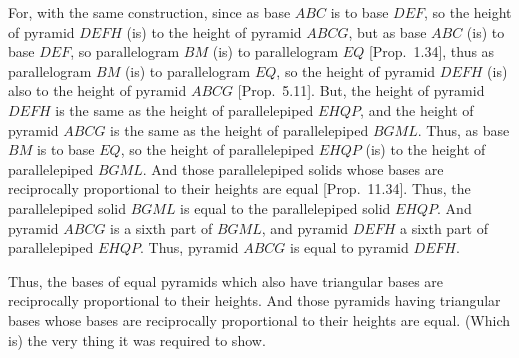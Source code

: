 \begin{Parallel}{}{}
{For, with the same construction, since as base $ABC$ is to base $DEF$, so the height of pyramid $DEFH$ (is)
to the height of pyramid $ABCG$, but as base $ABC$ (is) to base $DEF$, so parallelogram $BM$ (is)
to parallelogram $EQ$ [Prop.~1.34], thus as parallelogram $BM$ (is) to
parallelogram $EQ$, so the height of pyramid $DEFH$  (is) also to the height of pyramid $ABCG$ [Prop.~5.11]. But, 
the height of pyramid $DEFH$ is the same as the height of parallelepiped $EHQP$, and the height of
pyramid $ABCG$ is the same as the height of parallelepiped $BGML$. Thus, as base $BM$ is to
base $EQ$, so the height of parallelepiped $EHQP$ (is) to the height of parallelepiped $BGML$.
And those parallelepiped solids whose bases are reciprocally proportional to their
heights are equal [Prop.~11.34]. Thus, the parallelepiped solid $BGML$ is equal to the parallelepiped
solid $EHQP$. And pyramid $ABCG$ is a sixth part of $BGML$, and pyramid $DEFH$ a sixth part of
parallelepiped $EHQP$. Thus, pyramid $ABCG$ is equal to pyramid $DEFH$.

Thus,  the bases of equal pyramids which also have triangular bases are reciprocally
proportional to their heights. And those pyramids having triangular bases whose bases are reciprocally
proportional to their heights  are equal. (Which is) the very thing it was required to show.}
\end{Parallel}

